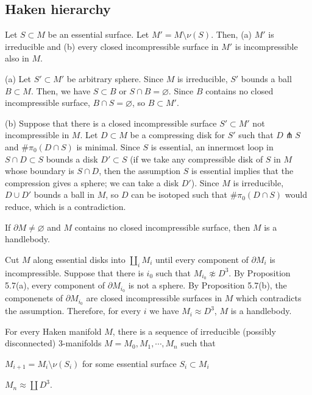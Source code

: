 \documentclass{../../../small}
\begin{document}
\subsection{Haken hierarchy}

\begin{prop}
Let $S\subset M$ be an essential surface.
Let $M'=M\setminus\nu(S)$.
Then, (a) $M'$ is irreducible and (b) every closed incompressible surface in $M'$ is incompressible also in $M$.
\end{prop}
\begin{pf}
(a)
Let $S'\subset M'$ be arbitrary sphere.
Since $M$ is irreducible, $S'$ bounds a ball $B\subset M$.
Then, we have $S\subset B$ or $S\cap B=\varnothing$.
Since $B$ contains no closed incompressible surface, $B\cap S=\varnothing$, so $B\subset M'$.

(b)
Suppose that there is a closed incompressible surface $S'\subset M'$ not incompressible in $M$.
Let $D\subset M$ be a compressing disk for $S'$ such that $D\pitchfork S$ and $\#\pi_0(D\cap S)$ is minimal.
Since $S$ is essential, an innermost loop in $S\cap D\subset S$ bounds a disk $D'\subset S$ (if we take any compressible disk of $S$ in $M$ whose boundary is $S\cap D$, then the assumption $S$ is essential implies that the compression gives a sphere; we can take a disk $D'$).
Since $M$ is irreducible, $D\cup D'$ bounds a ball in $M$, so $D$ can be isotoped such that $\#\pi_0(D\cap S)$ would reduce, which is a contradiction.
\end{pf}

\begin{prop}
If $\partial M\ne\varnothing$ and $M$ contains no closed incompressible surface, then $M$ is a handlebody.
\begin{pf}
Cut $M$ along essential disks into $\coprod_iM_i$ until every component of $\partial M_i$ is incompressible.
Suppose that there is $i_0$ such that $M_{i_0}\not\approx D^3$.
By Proposition 5.7(a), every component of $\partial M_{i_0}$ is not a sphere.
By Proposition 5.7(b), the componenets of $\partial M_{i_0}$ are closed incompressible surfaces in $M$ which contradicts the assumption.
Therefore, for every $i$ we have $M_i\approx D^3$, $M$ is a handlebody.
\end{pf}
\end{prop}

\begin{thm}
For every Haken manifold $M$, there is a sequence of irreducible (possibly disconnected) 3-manifolds $M=M_0,M_1,\cdots,M_n$ such that
\begin{parts}
	\item $M_{i+1}=M_i\setminus\nu(S_i)$ for some essential surface $S_i\subset M_i$
	\item $M_n\approx \coprod D^3$.
\end{parts}
\end{thm}
\end{document}
